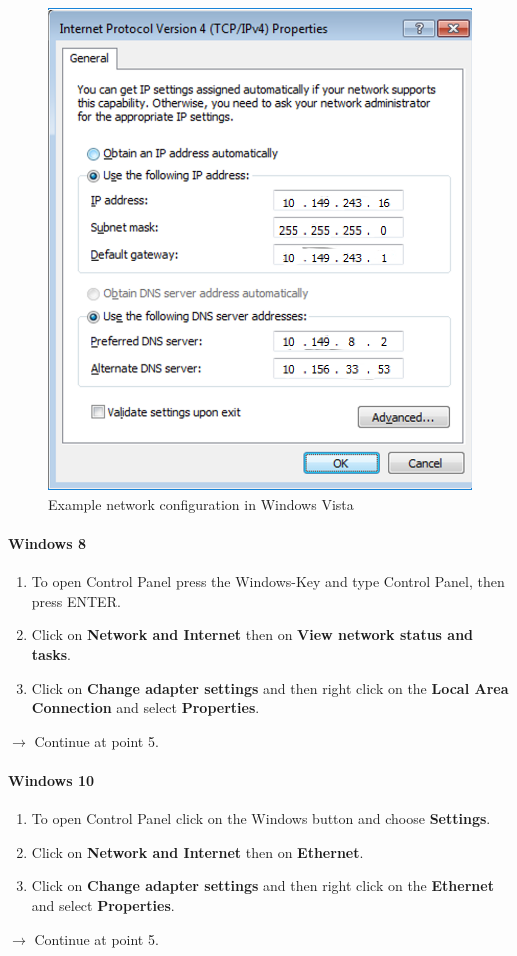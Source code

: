\documentclass[a4paper,12pt]{scrartcl}
\newcommand{\optemph}[1]{\textbf{#1}}
\begin{document}
\begin{figure}[h!]
\begin{minipage}[c]{0.48\linewidth}
          \includegraphics[width=\linewidth,keepaspectratio]{Bilder/IP_Windows_EN_mb}
          \caption{Example network configuration in Windows Vista}
        \end{minipage}
      \vspace{-15pt}
      \end{figure}
\paragraph*{Windows 8}
\begin{enumerate}	
	\item To open Control Panel press the Windows-Key and type Control Panel, then press ENTER.
    \item Click on \optemph{Network and Internet} then on \optemph{View network status and tasks}.
	\item Click on \optemph{Change adapter settings} and then right click on the \optemph{Local Area Connection} and select \optemph{Properties}.
\end{enumerate}
$\rightarrow$ Continue at point 5.
\paragraph*{Windows 10}
\begin{enumerate}	
	\item To open Control Panel click on the Windows button and choose \optemph{Settings}.
    \item Click on \optemph{Network and Internet} then on \optemph{Ethernet}.
	\item Click on \optemph{Change adapter settings} and then right click on the \optemph{Ethernet} and select \optemph{Properties}.
\end{enumerate}
$\rightarrow$ Continue at point 5.
\end{document}
